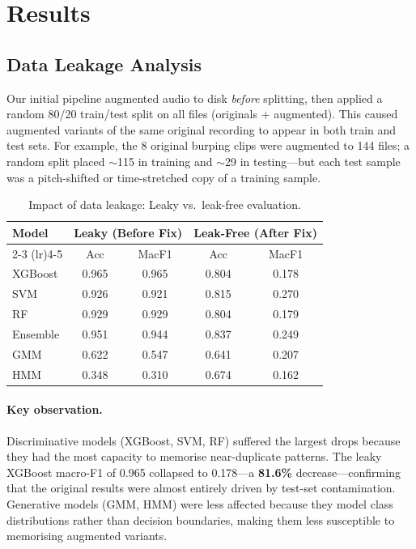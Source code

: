 \documentclass[11pt,a4paper]{article}
\begin{document}
\section{Results}
\label{sec:results}

\subsection{Data Leakage Analysis}
\label{sec:leakage}

Our initial pipeline augmented audio to disk \textit{before} splitting,
then applied a random 80/20 train/test split on all files (originals +
augmented). This caused augmented variants of the same original
recording to appear in both train and test sets. For example, the 8
original burping clips were augmented to 144 files; a random split
placed $\sim$115 in training and $\sim$29 in testing---but each test
sample was a pitch-shifted or time-stretched copy of a training sample.

\begin{table}[H]
\centering
\caption{Impact of data leakage: Leaky vs.\ leak-free evaluation.}
\label{tab:leakage}
\begin{tabular}{lcccc}
\toprule
\textbf{Model} & \multicolumn{2}{c}{\textbf{Leaky (Before Fix)}} & \multicolumn{2}{c}{\textbf{Leak-Free (After Fix)}} \\
\cmidrule(lr){2-3} \cmidrule(lr){4-5}
 & Acc & MacF1 & Acc & MacF1 \\
\midrule
XGBoost   & 0.965 & 0.965 & 0.804 & 0.178 \\
SVM       & 0.926 & 0.921 & 0.815 & 0.270 \\
RF        & 0.929 & 0.929 & 0.804 & 0.179 \\
Ensemble  & 0.951 & 0.944 & 0.837 & 0.249 \\
GMM       & 0.622 & 0.547 & 0.641 & 0.207 \\
HMM       & 0.348 & 0.310 & 0.674 & 0.162 \\
\bottomrule
\end{tabular}
\end{table}

\paragraph{Key observation.}
Discriminative models (XGBoost, SVM, RF) suffered the largest drops
because they had the most capacity to memorise near-duplicate patterns.
The leaky XGBoost macro-F1 of 0.965 collapsed to 0.178---a
\textbf{81.6\%} decrease---confirming that the original results were
almost entirely driven by test-set contamination. Generative models
(GMM, HMM) were less affected because they model class distributions
rather than decision boundaries, making them less susceptible to
memorising augmented variants.
\end{document}

